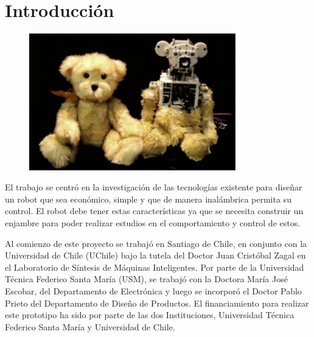 
\chapter{Introducción} %

\label{Chapter1} %





\begin{figure}[htbp]
	\centering
		\includegraphics[width=0.8\textwidth]{./Figures/robot.jpg}
	\label{fig:Huggable}
\end{figure}

El trabajo se centró en la investigación de las tecnologías existente para diseñar un robot que sea económico, simple y que de manera inalámbrica permita su control. El robot debe tener estas características ya que se necesita construir un enjambre para poder realizar estudios en el comportamiento y control de estos.

Al comienzo de este proyecto se trabajó en Santiago de Chile, en conjunto con la Universidad de Chile (UChile) bajo la tutela del Doctor Juan Cristóbal Zagal en el Laboratorio de Síntesis de Máquinas Inteligentes. Por parte de la Universidad Técnica Federico Santa María (USM), se trabajó con la Doctora María José Escobar, del Departamento de Electrónica y luego se incorporó el Doctor Pablo Prieto del Departamento de Diseño de Productos. El financiamiento para realizar este prototipo ha sido por parte de las dos Instituciones, Universidad Técnica Federico Santa María y Universidad de Chile.

